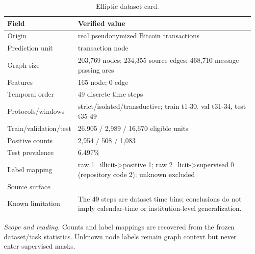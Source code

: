 \begin{table}[tbp]
\centering
\footnotesize
\setlength{\tabcolsep}{3.2pt}
\renewcommand{\arraystretch}{1.12}
\caption{Elliptic dataset card.}
\label{tab:s-dataset-elliptic}
\begin{tabularx}{\textwidth}{@{}>{\raggedright\arraybackslash}p{} Y@{}}
\toprule
\textbf{Field} & \textbf{Verified value} \\
\midrule
Origin & real pseudonymized Bitcoin transactions \\
Prediction unit & transaction node \\
Graph size & 203,769 nodes; 234,355 source edges; 468,710 message-passing arcs \\
Features & 165 node; 0 edge \\
Temporal order & 49 discrete time steps \\
Protocols/windows & strict/isolated/transductive; train t1-30, val t31-34, test t35-49 \\
Train/validation/test & 26,905 / 2,989 / 16,670 eligible units \\
Positive counts & 2,954 / 508 / 1,083 \\
Test prevalence & 6.497\% \\
Label mapping & raw 1=illicit->positive 1; raw 2=licit->supervised 0 (repository code 2); unknown excluded \\
Source surface &  \\
Known limitation & The 49 steps are dataset time bins; conclusions do not imply calendar-time or institution-level generalization. \\
\bottomrule
\end{tabularx}
\vspace{2pt}
\begin{minipage}{\textwidth}\footnotesize\emph{Scope and reading.} Counts and label mappings are recovered from the frozen dataset/task statistics. Unknown node labels remain graph context but never enter supervised masks.\end{minipage}
\end{table}
